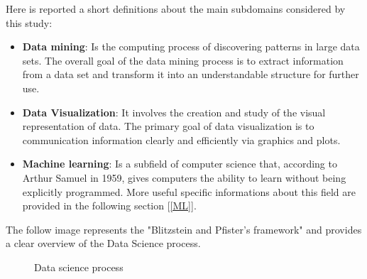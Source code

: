 \newpage 

Here is reported a short definitions about the main subdomains considered by this study:
\begin{itemize}

\item \textbf{Data mining}: Is the computing process of discovering patterns in large data sets. The overall goal of the data mining process is to extract information from a data set and transform it into an understandable structure for further use.

\item \textbf{Data Visualization}: It involves the creation and study of the visual representation of data. The primary goal of data visualization is to communication information clearly and efficiently via graphics and plots.

\item \textbf{Machine learning}: Is a subfield of computer science that, according to Arthur Samuel in 1959, gives computers the ability to learn without being explicitly programmed. More useful specific informations about this field are provided in the following section [\ref{ML}].
\end{itemize}

The follow image represents the "Blitzstein and Pfister's framework" and provides a clear overview of the Data Science process.
\begin{figure}[H]
    \centering
    \caption[Data science process]{Data science process}
    \label{fig: Data_science}
\end{figure}



